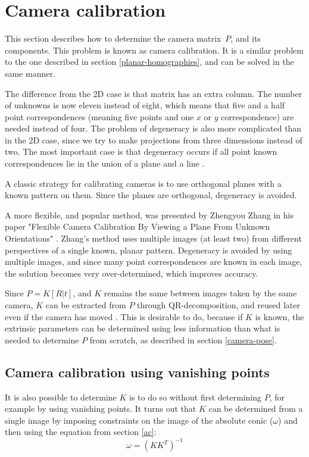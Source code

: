 \section{Camera calibration} \label{camera-calibration}
This section describes how to determine the camera matrix $P$, and its components.
This problem is known as camera calibration.
It is a similar problem to the one described in section \ref{planar-homographies}, and can be solved in the same manner.

The difference from the 2D case is that matrix has an extra column. The number of unknowns is now eleven instead of eight, which means that five and a half point correspondences (meaning five points and one $x$ or $y$ correspondence) are needed instead of four.
The problem of degeneracy is also more complicated than in the 2D case, since we try to make projections from three dimensions instead of two.
The most important case is that degeneracy occurs if all point known correspondences lie in the union of a plane and a line \cite[p. 179-180]{hartley-zisserman}. 

A classic strategy for calibrating cameras is to use orthogonal planes with a known pattern on them. 
Since the planes are orthogonal, degeneracy is avoided.

A more flexible, and popular method, was presented by Zhengyou Zhang in his paper "Flexible Camera Calibration By Viewing a Plane From Unknown Orientations" \cite{zhang-calibration}.
Zhang's method uses multiple images (at least two) from different perspectives of a single known, planar pattern.
Degeneracy is avoided by using multiple images, and since many point correspondences are known in each image, the solution becomes very over-determined, which improves accuracy.

Since $P=K[R|t]$, and $K$ remains the same between images taken by the same camera, $K$ can be extracted from $P$ through QR-decomposition, and reused later even if the camera has moved \cite{wiki:qr-decomposition}. 
This is desirable to do, because if $K$ is known, the extrinsic parameters can be determined using less information than what is needed to determine $P$ from scratch, as described in section \ref{camera-pose}.

\subsection{Camera calibration using vanishing points} \label{background:vanishing_point_calibration}
It is also possible to determine $K$ is to do so without first determining $P$, for example by using vanishing points.
It turns out that $K$ can be determined from a single image by imposing constraints on the image of the absolute conic ($\omega$) and then using the equation from section \ref{ac}:
\begin{equation} \label{eq:conic_k}
	\omega = (KK^T)^{-1}
\end{equation}

